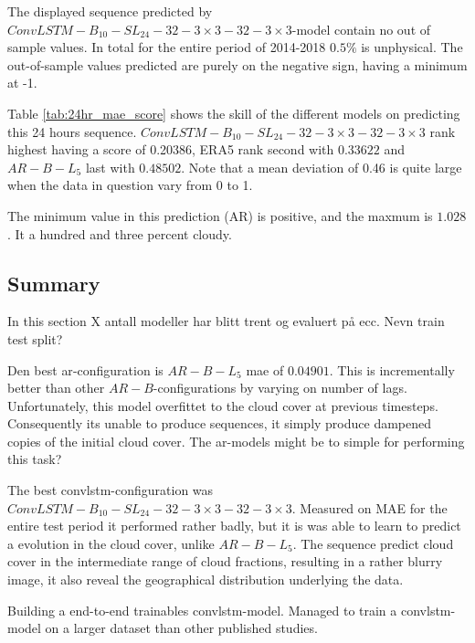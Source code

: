 The displayed sequence predicted by $ConvLSTM-B_{10}-SL_{24}-32-3\times3-32-3 \times3$-model contain no out of sample values. In total for the entire period of 2014-2018 $0.5\%$ is unphysical. The out-of-sample values predicted are purely on the negative sign, having a minimum at -1. 

Table \ref{tab:24hr_mae_score} shows the skill of the different models on predicting this 24 hours sequence. $ConvLSTM-B_{10}-SL_{24}-32-3\times3-32-3\times3$ rank highest having a score of 0.20386, ERA5 rank second with  $0.33622$ and $AR-B-L_5$ last with  $0.48502$. Note that a mean deviation of 0.46 is quite large when the data in question vary from 0 to 1. 


The minimum value in this prediction (AR) is positive, and the maxmum is $1.028$. It a hundred and three percent cloudy. 



\subsection{Summary} \label{sec:summary_num}
In this section X antall modeller har blitt trent og evaluert på ecc. Nevn train test split?

Den best \acrshort{ar}-configuration is $AR-B-L_5$ \acrshort{mae} of $0.04901$. This is incrementally better than other $AR-B$-configurations by  varying on number of lags. Unfortunately, this model overfittet to the cloud cover at previous timesteps. Consequently its unable to produce sequences, it simply produce dampened copies of the initial cloud cover. The \acrshort{ar}-models might be to simple for performing this task? 

The best \acrshort{convlstm}-configuration was $ConvLSTM-B_{10}-SL_{24}-32-3\times3-32-3\times3$. Measured on MAE for the entire test period it performed rather badly, but it is was able to learn to predict a evolution in the cloud cover, unlike $AR-B-L_5$. The sequence predict cloud cover in the intermediate range of cloud fractions, resulting in a rather blurry image, it also reveal the geographical distribution underlying the data. 

Building a end-to-end trainables \acrshort{convlstm}-model. Managed to train a \acrshort{convlstm}-model on a larger dataset than other published studies.


